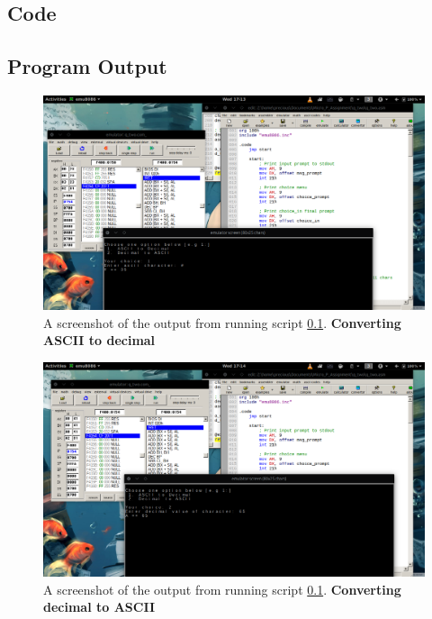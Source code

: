 \documentclass[]{article}
\begin{document}
\subsection{Code} \label{sketch 2}


\clearpage
\subsection{Program Output}

\begin{figure}[h]
	\includegraphics[width=12cm]{q_two/q2_ascii_to_dec.png}
	\centering
	\caption{A screenshot of the output from running script \ref{sketch 2}. \textbf{Converting ASCII to decimal}}
\end{figure}

\begin{figure}[h]
	\includegraphics[width=12cm]{q_two/q2_dec_to_ascii.png}
	\centering
	\caption{A screenshot of the output from running script \ref{sketch 2}. \textbf{Converting decimal to ASCII}}
\end{figure}
\end{document}
